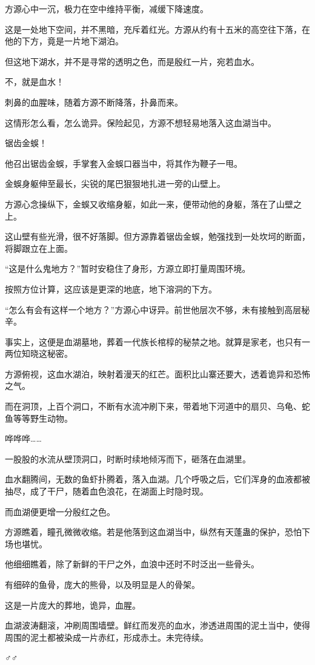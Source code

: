 \begin{this_body}
方源心中一沉，极力在空中维持平衡，减缓下降速度。

这是一处地下空间，并不黑暗，充斥着红光。方源从约有十五米的高空往下落，在他的下方，竟是一片地下湖泊。

但这地下湖水，并不是寻常的透明之色，而是殷红一片，宛若血水。

不，就是血水！

刺鼻的血腥味，随着方源不断降落，扑鼻而来。

这情形怎么看，怎么诡异。保险起见，方源不想轻易地落入这血湖当中。

锯齿金蜈！

他召出锯齿金蜈，手掌套入金蜈口器当中，将其作为鞭子一甩。

金蜈身躯伸至最长，尖锐的尾巴狠狠地扎进一旁的山壁上。

方源心念操纵下，金蜈又收缩身躯，如此一来，便带动他的身躯，落在了山壁之上。

这山壁有些光滑，很不好落脚。但方源靠着锯齿金蜈，勉强找到一处坎坷的断面，将脚跟立在上面。

“这是什么鬼地方？”暂时安稳住了身形，方源立即打量周围环境。

按照方位计算，这应该是更深的地底，地下溶洞的下方。

“怎么有会有这样一个地方？”方源心中讶异。前世他层次不够，未有接触到高层秘辛。

事实上，这便是血湖墓地，葬着一代族长棺椁的秘禁之地。就算是家老，也只有一两位知晓这秘密。

方源俯视，这血水湖泊，映射着漫天的红芒。面积比山寨还要大，透着诡异和恐怖之气。

而在洞顶，上百个洞口，不断有水流冲刷下来，带着地下河道中的扇贝、乌龟、蛇鱼等等野生动物。

哗哗哗……

一股股的水流从壁顶洞口，时断时续地倾泻而下，砸落在血湖里。

血水翻腾间，无数的鱼虾扑腾着，落入血湖。几个呼吸之后，它们浑身的血液都被抽尽，成了干尸，随着血色浪花，在湖面上时隐时现。

而血湖便更增一分殷红之色。

方源瞧着，瞳孔微微收缩。若是他落到这血湖当中，纵然有天蓬蛊的保护，恐怕下场也堪忧。

他细细瞧着，除了新鲜的干尸之外，血浪中还时不时泛出一些骨头。

有细碎的鱼骨，庞大的熊骨，以及明显是人的骨架。

这是一片庞大的葬地，诡异，血腥。

血湖波涛翻滚，冲刷周围墙壁。鲜红而发亮的血水，渗透进周围的泥土当中，使得周围的泥土都被染成一片赤红，形成赤土。未完待续。

♂♂

\end{this_body}

